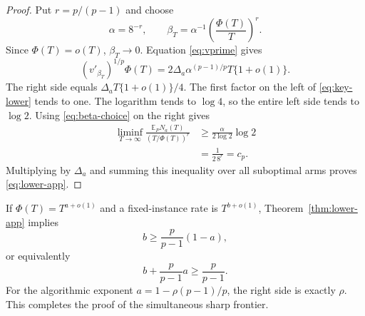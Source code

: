 \documentclass[twoside]{article}
\newcommand{\E}{\mathbb E}
\begin{document}
\begin{proof}
Put $r=p/(p-1)$ and choose
\begin{equation}
 \alpha=8^{-r},
 \qquad
 \beta_T=\alpha^{-1}\left(\frac{\Phi(T)}T\right)^r.
 \label{eq:beta-choice}
\end{equation}
Since $\Phi(T)=o(T)$, $\beta_T\to0$. Equation \eqref{eq:vprime} gives
\begin{equation}
 (v'_{\beta_T})^{1/p}\Phi(T)
 =2\Delta_a\alpha^{(p-1)/p}T\{1+o(1)\}.
 \label{eq:vprime-limit}
\end{equation}
The right side equals $\Delta_a T\{1+o(1)\}/4$.
The first factor on the left of \eqref{eq:key-lower} tends to one. The
logarithm tends to $\log4$, so the entire left side tends to $\log2$.
Using \eqref{eq:beta-choice} on the right gives
\begin{align*}
 \liminf_{T\to\infty}
 \frac{\E_PN_a(T)}{(T/\Phi(T))^r}
 &\geq\frac{\alpha}{2\log2}\log2\\
 &=\frac1{2\,8^r}=c_p.
\end{align*}
Multiplying by $\Delta_a$ and summing this inequality over all suboptimal
arms proves \eqref{eq:lower-app}.
\end{proof}

If $\Phi(T)=T^{a+o(1)}$ and a fixed-instance rate is
$T^{b+o(1)}$, Theorem~\ref{thm:lower-app} implies
\[
 b\geq\frac{p}{p-1}(1-a),
\]
or equivalently
\[
 b+\frac{p}{p-1}a\geq\frac{p}{p-1}.
\]
For the algorithmic exponent
$a=1-\rho(p-1)/p$, the right side is exactly $\rho$. This completes the
proof of the simultaneous sharp frontier.


\end{document}
